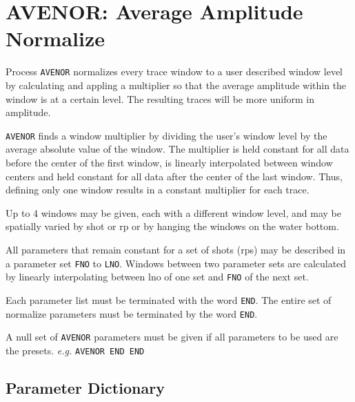 \section{AVENOR: Average Amplitude Normalize}
\label{cmd_avenor}

Process \texttt{AVENOR} normalizes every trace window to a user described
window level by calculating and appling a multiplier so that the average
amplitude within the window is at a certain level.  The resulting traces will
be more uniform in amplitude.

\texttt{AVENOR} finds a window multiplier by dividing the user's window level
by the average absolute value of the window.  The multiplier is held constant
for all data before the center of the first window, is linearly interpolated
between window centers and held constant for all data after the center of the
last window.  Thus, defining only one window results in a constant multiplier
for each trace.

Up to 4 windows may be given, each with a different window level, and may be
spatially varied by \gls{shot} or \gls{rp} or by hanging the windows on the water bottom.

All parameters that remain constant for a set of \glspl{shot} (\glspl{rp}) may be described
in a parameter set \texttt{FNO} to \texttt{LNO}.  Windows between two parameter
sets are calculated by linearly interpolating between lno of one set and
\texttt{FNO} of the next set.

Each parameter list must be terminated with the word \texttt{END}.  The entire
set of normalize parameters must be terminated by the word \texttt{END}.

A null set of \texttt{AVENOR} parameters must be given if all parameters to be
used are the presets.  \textit{e.g.} \texttt{AVENOR END END}

\subsection{Parameter Dictionary}

